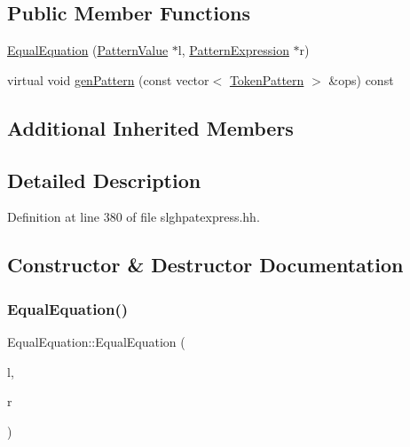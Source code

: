 \subsection*{Public Member Functions}
\begin{DoxyCompactItemize}
\item 
\mbox{\hyperlink{class_equal_equation_ab686975b7b861dac886bfd66339567e1}{Equal\+Equation}} (\mbox{\hyperlink{class_pattern_value}{Pattern\+Value}} $\ast$l, \mbox{\hyperlink{class_pattern_expression}{Pattern\+Expression}} $\ast$r)
\item 
virtual void \mbox{\hyperlink{class_equal_equation_a39dc966c60f2cf4fa28753e3057536a0}{gen\+Pattern}} (const vector$<$ \mbox{\hyperlink{class_token_pattern}{Token\+Pattern}} $>$ \&ops) const
\end{DoxyCompactItemize}
\subsection*{Additional Inherited Members}


\subsection{Detailed Description}


Definition at line 380 of file slghpatexpress.\+hh.



\subsection{Constructor \& Destructor Documentation}
\mbox{\label{class_equal_equation_ab686975b7b861dac886bfd66339567e1}} 
\subsubsection{\texorpdfstring{EqualEquation()}{EqualEquation()}}
{\footnotesize\ttfamily Equal\+Equation\+::\+Equal\+Equation (\begin{DoxyParamCaption}\item[{\mbox{\hyperlink{class_pattern_value}{Pattern\+Value}} $\ast$}]{l,  }\item[{\mbox{\hyperlink{class_pattern_expression}{Pattern\+Expression}} $\ast$}]{r }\end{DoxyParamCaption})\hspace{0.3cm}{\ttfamily [inline]}}



